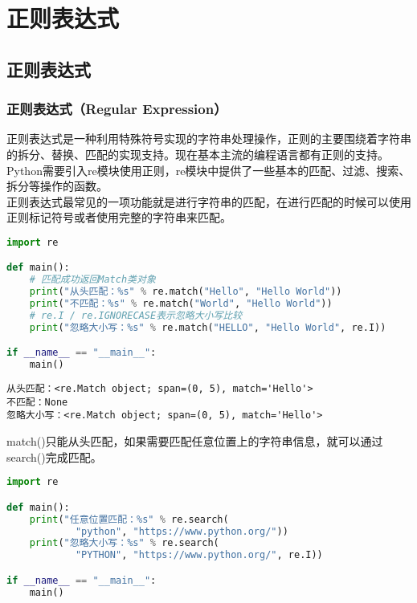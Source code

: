 \chapter{正则表达式}

\section{正则表达式}

\subsection{正则表达式（Regular Expression）}

正则表达式是一种利用特殊符号实现的字符串处理操作，正则的主要围绕着字符串的拆分、替换、匹配的实现支持。现在基本主流的编程语言都有正则的支持。\\

Python需要引入re模块使用正则，re模块中提供了一些基本的匹配、过滤、搜索、拆分等操作的函数。\\

正则表达式最常见的一项功能就是进行字符串的匹配，在进行匹配的时候可以使用正则标记符号或者使用完整的字符串来匹配。\\


\begin{lstlisting}[language=Python]
import re

def main():
    # 匹配成功返回Match类对象
    print("从头匹配：%s" % re.match("Hello", "Hello World"))
    print("不匹配：%s" % re.match("World", "Hello World"))
    # re.I / re.IGNORECASE表示忽略大小写比较
    print("忽略大小写：%s" % re.match("HELLO", "Hello World", re.I))

if __name__ == "__main__":
    main()
\end{lstlisting}

\begin{tcolorbox}
	\begin{verbatim}
从头匹配：<re.Match object; span=(0, 5), match='Hello'>
不匹配：None
忽略大小写：<re.Match object; span=(0, 5), match='Hello'>
\end{verbatim}
\end{tcolorbox}

match()只能从头匹配，如果需要匹配任意位置上的字符串信息，就可以通过search()完成匹配。\\


\begin{lstlisting}[language=Python]
import re

def main():
    print("任意位置匹配：%s" % re.search(
            "python", "https://www.python.org/"))
    print("忽略大小写：%s" % re.search(
            "PYTHON", "https://www.python.org/", re.I))

if __name__ == "__main__":
    main()
\end{lstlisting}

